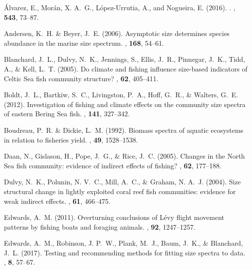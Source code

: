 \documentclass[12pt, letter]{article}
\begin{document}
\begin{thebibliography}{}

\'Alvarez, E., Mor\'an, X. A.~G., L\'opez-Urrutia, A., and Nogueira, E. (2016).
.
, {\bf 543}, 73--87.

Andersen, K.~H. \& Beyer, J.~E. (2006).
\newblock Asymptotic size determines species abundance in the marine size
  spectrum.
, {\bf 168}, 54--61.

Blanchard, J.~L., Dulvy, N.~K., Jennings, S., Ellis, J.~R., Pinnegar, J.~K.,
  Tidd, A., \& Kell, L.~T. (2005).
\newblock Do climate and fishing influence size-based indicators of {C}eltic
  {S}ea fish community structure?
, {\bf 62}, 405--411.

Boldt, J.~L., Bartkiw, S.~C., Livingston, P.~A., Hoff, G.~R., \& Walters,
  G.~E. (2012).
\newblock Investigation of fishing and climate effects on the community size
  spectra of eastern {B}ering {S}ea fish.
, {\bf 141}, 327--342.

Boudreau, P.~R. \& Dickie, L.~M. (1992).
\newblock Biomass spectra of aquatic ecosystems in relation to fisheries yield.
, {\bf 49}, 1528--1538.

Daan, N., Gislason, H., Pope, J.~G., \& Rice, J.~C. (2005).
\newblock Changes in the {N}orth {S}ea fish community: evidence of indirect
  effects of fishing?
, {\bf 62}, 177--188.

Dulvy, N.~K., Polunin, N. V.~C., Mill, A.~C., \& Graham, N. A.~J. (2004).
\newblock Size structural change in lightly exploited coral reef fish
  communities: evidence for weak indirect effects.
, {\bf 61}, 466--475.

Edwards, A.~M. (2011).
\newblock Overturning conclusions of {{L}}\'evy flight movement patterns by
  fishing boats and foraging animals.
, {\bf 92}, 1247--1257.

Edwards, A.~M., Robinson, J. P.~W., Plank, M.~J., Baum, J.~K., \& Blanchard,
  J.~L. (2017).
\newblock Testing and recommending methods for fitting size spectra to data.
, {\bf 8}, 57--67.


\end{thebibliography}
\end{document}
